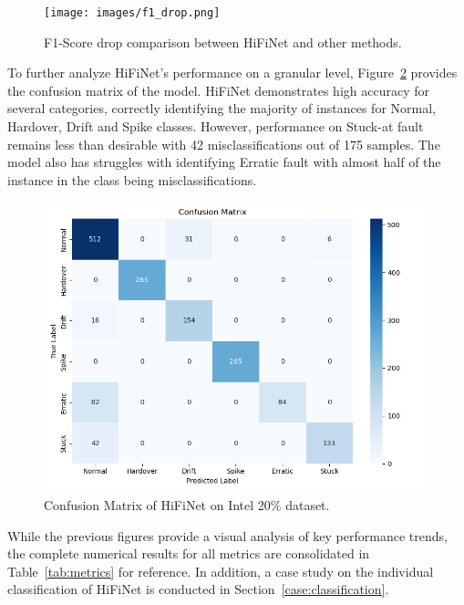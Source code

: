 \begin{figure}
  \centering
  \texttt{[image: images/f1\_drop.png]}
  \caption{F1-Score drop comparison between HiFiNet and other methods.}
  \label{fig:f1_drop}
\end{figure}

To further analyze HiFiNet's performance on a granular level, Figure~\ref{fig:confusion_matrix} provides the confusion matrix of the model. HiFiNet demonstrates high accuracy for several categories, correctly identifying the majority of instances for Normal, Hardover, Drift and Spike classes. However, performance on Stuck-at fault remains less than desirable with 42 misclassifications out of 175 samples. The model also has struggles with identifying Erratic fault with almost half of the instance in the class being misclassifications.

\begin{figure}
  \centering
  \includegraphics[width=\linewidth]{images/confusion_matrix.png}
  \caption{Confusion Matrix of HiFiNet on Intel 20\% dataset.}
  \label{fig:confusion_matrix}
\end{figure}

While the previous figures provide a visual analysis of key performance trends, the complete numerical results for all metrics are consolidated in Table~\ref{tab:metrics} for reference. In addition, a case study on the individual classification of HiFiNet is conducted in Section~\ref{case:classification}.

